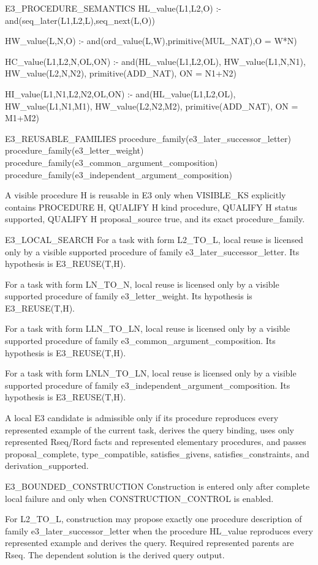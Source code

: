 E3_PROCEDURE_SEMANTICS
HL_value(L1,L2,O) :-
    and(seq_later(L1,L2,L),seq_next(L,O))

HW_value(L,N,O) :-
    and(ord_value(L,W),primitive(MUL_NAT),O = W*N)

HC_value(L1,L2,N,OL,ON) :-
    and(HL_value(L1,L2,OL),
        HW_value(L1,N,N1),
        HW_value(L2,N,N2),
        primitive(ADD_NAT),
        ON = N1+N2)

HI_value(L1,N1,L2,N2,OL,ON) :-
    and(HL_value(L1,L2,OL),
        HW_value(L1,N1,M1),
        HW_value(L2,N2,M2),
        primitive(ADD_NAT),
        ON = M1+M2)

E3_REUSABLE_FAMILIES
procedure_family(e3_later_successor_letter)
procedure_family(e3_letter_weight)
procedure_family(e3_common_argument_composition)
procedure_family(e3_independent_argument_composition)

A visible procedure H is reusable in E3 only when VISIBLE_KS explicitly
contains PROCEDURE H, QUALIFY H kind procedure, QUALIFY H status supported,
QUALIFY H proposal_source true, and its exact procedure_family.

E3_LOCAL_SEARCH
For a task with form L2_TO_L, local reuse is licensed only by a visible
supported procedure of family e3_later_successor_letter.  Its hypothesis is
E3_REUSE(T,H).

For a task with form LN_TO_N, local reuse is licensed only by a visible
supported procedure of family e3_letter_weight.  Its hypothesis is
E3_REUSE(T,H).

For a task with form LLN_TO_LN, local reuse is licensed only by a visible
supported procedure of family e3_common_argument_composition.  Its hypothesis
is E3_REUSE(T,H).

For a task with form LNLN_TO_LN, local reuse is licensed only by a visible
supported procedure of family e3_independent_argument_composition.  Its
hypothesis is E3_REUSE(T,H).

A local E3 candidate is admissible only if its procedure reproduces every
represented example of the current task, derives the query binding, uses only
represented Rseq/Rord facts and represented elementary procedures, and passes
proposal_complete, type_compatible, satisfies_givens, satisfies_constraints,
and derivation_supported.

E3_BOUNDED_CONSTRUCTION
Construction is entered only after complete local failure and only when
CONSTRUCTION_CONTROL is enabled.

For L2_TO_L, construction may propose exactly one procedure description of
family e3_later_successor_letter when the procedure HL_value reproduces every
represented example and derives the query.  Required represented parents are
Rseq.  The dependent solution is the derived query output.

